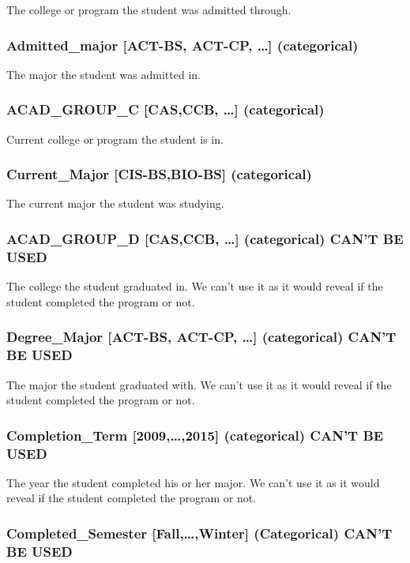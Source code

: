 \documentclass{article}
\begin{document}
The college or program the student was admitted through.

\subsubsection*{Admitted\_major [ACT-BS, ACT-CP, \dots] (categorical)}

The major the student was admitted in.

\subsubsection*{ACAD\_GROUP\_C [CAS,CCB, \dots] (categorical)}

Current college or program the student is in.

\subsubsection*{Current\_Major [CIS-BS,BIO-BS] (categorical)}

The current major the student was studying.

\subsubsection*{ACAD\_GROUP\_D [CAS,CCB, \dots] (categorical) CAN'T BE USED}

The college the student graduated in. We can't use it as it would reveal if the student completed the program or not.

\subsubsection*{Degree\_Major [ACT-BS, ACT-CP, \dots] (categorical) CAN'T BE USED}

The major the student graduated with. We can't use it as it would reveal if the student completed the program or not.

\subsubsection*{Completion\_Term [2009,\dots,2015] (categorical) CAN'T BE USED}

The year the student completed his or her major. We can't use it as it would reveal if the student completed the program or not.

\subsubsection*{Completed\_Semester [Fall,\dots,Winter] (Categorical) CAN'T BE USED}
\end{document}
